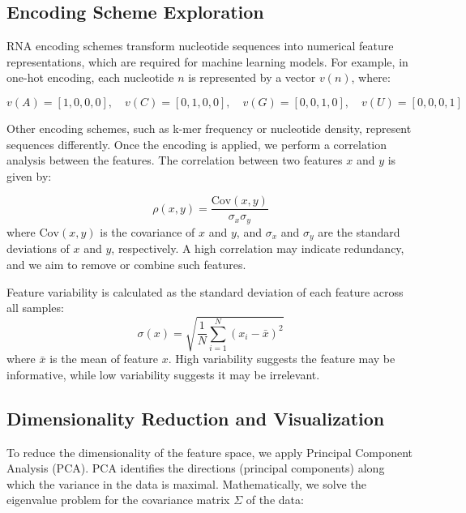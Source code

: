   \subsection{Encoding Scheme Exploration}\label{subsec:encoding-scheme-exploration}
    RNA encoding schemes transform nucleotide sequences into numerical feature representations, which are required for machine learning models. For example, in one-hot encoding, each nucleotide \( n \) is represented by a vector \( v(n) \), where:

    \[
      v(A) = [1, 0, 0, 0], \quad v(C) = [0, 1, 0, 0], \quad v(G) = [0, 0, 1, 0], \quad v(U) = [0, 0, 0, 1]
    \]

    Other encoding schemes, such as k-mer frequency or nucleotide density, represent sequences differently. Once the encoding is applied, we perform a correlation analysis between the features. The correlation between two features \( x \) and \( y \) is given by:

    \[
      \rho(x, y) = \frac{\text{Cov}(x, y)}{\sigma_x \sigma_y}
    \]
    where \( \text{Cov}(x, y) \) is the covariance of \( x \) and \( y \), and \( \sigma_x \) and \( \sigma_y \) are the standard deviations of \( x \) and \( y \), respectively. A high correlation may indicate redundancy, and we aim to remove or combine such features.

    Feature variability is calculated as the standard deviation of each feature across all samples:
    \[
      \sigma(x) = \sqrt{\frac{1}{N} \sum_{i=1}^{N} (x_i - \bar{x})^2}
    \]
    where \( \bar{x} \) is the mean of feature \( x \). High variability suggests the feature may be informative, while low variability suggests it may be irrelevant.

%

  \subsection{Dimensionality Reduction and Visualization}\label{subsec:dimensionality-reduction-and-visualization}
    To reduce the dimensionality of the feature space, we apply Principal Component Analysis (PCA). PCA identifies the directions (principal components) along which the variance in the data is maximal. Mathematically, we solve the eigenvalue problem for the covariance matrix \( \Sigma \) of the data:

